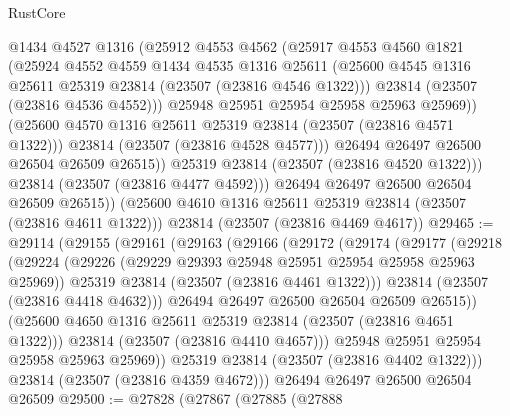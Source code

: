 \begin{lexlean}{RustCore}
\begin{coremodule}
                  @1434
                  @4527
                  @1316
                  (@25912
                    @4553
                    @4562
                    (@25917
                      @4553
                      @4560
                      @1821
                      (@25924
                        @4552
                        @4559
                        @1434
                        @4535
                        @1316
                        @25611
                        (@25600 @4545 @1316 @25611 @25319 @23814 (@23507 (@23816 @4546 @1322)))
                        @23814
                        (@23507 (@23816 @4536 @4552)))
                      @25948
                      @25951
                      @25954
                      @25958
                      @25963
                      @25969))
                  (@25600 @4570 @1316 @25611 @25319 @23814 (@23507 (@23816 @4571 @1322)))
                  @23814
                  (@23507 (@23816 @4528 @4577)))
                @26494
                @26497
                @26500
                @26504
                @26509
                @26515))
            @25319
            @23814
            (@23507 (@23816 @4520 @1322)))
          @23814
          (@23507 (@23816 @4477 @4592)))
        @26494
        @26497
        @26500
        @26504
        @26509
        @26515))
    (@25600 @4610 @1316 @25611 @25319 @23814 (@23507 (@23816 @4611 @1322)))
    @23814
    (@23507 (@23816 @4469 @4617))
@29465 := @29114
    (@29155
      (@29161
        (@29163
          (@29166
            (@29172
              (@29174
                (@29177
                  (@29218
                    (@29224
                      (@29226 (@29229 @29393 @25948 @25951 @25954 @25958 @25963 @25969))
                      @25319
                      @23814
                      (@23507 (@23816 @4461 @1322)))
                    @23814
                    (@23507 (@23816 @4418 @4632)))
                  @26494
                  @26497
                  @26500
                  @26504
                  @26509
                  @26515))
              (@25600 @4650 @1316 @25611 @25319 @23814 (@23507 (@23816 @4651 @1322)))
              @23814
              (@23507 (@23816 @4410 @4657)))
            @25948
            @25951
            @25954
            @25958
            @25963
            @25969))
        @25319
        @23814
        (@23507 (@23816 @4402 @1322)))
      @23814
      (@23507 (@23816 @4359 @4672)))
    @26494
    @26497
    @26500
    @26504
    @26509
@29500 := @27828
    (@27867
      (@27885
        (@27888

\end{coremodule}
\end{lexlean}
